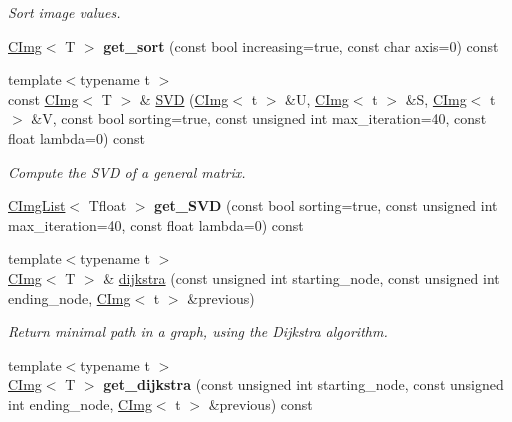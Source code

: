 \begin{DoxyCompactItemize}
\begin{DoxyCompactList}\small\item\em Sort image values. \item\end{DoxyCompactList}\item 
\hypertarget{structcimg__library_1_1CImg_a59e38885c680b39494d35dce5e6b2ff1}{
\hyperlink{structcimg__library_1_1CImg}{CImg}$<$ T $>$ {\bfseries get\_\-sort} (const bool increasing=true, const char axis=0) const }
\label{structcimg__library_1_1CImg_a59e38885c680b39494d35dce5e6b2ff1}

\item 
\hypertarget{structcimg__library_1_1CImg_a9a79f3a0849388b3ec13bd140b67a12e}{
{\footnotesize template$<$typename t $>$ }\\const \hyperlink{structcimg__library_1_1CImg}{CImg}$<$ T $>$ \& \hyperlink{structcimg__library_1_1CImg_a9a79f3a0849388b3ec13bd140b67a12e}{SVD} (\hyperlink{structcimg__library_1_1CImg}{CImg}$<$ t $>$ \&U, \hyperlink{structcimg__library_1_1CImg}{CImg}$<$ t $>$ \&S, \hyperlink{structcimg__library_1_1CImg}{CImg}$<$ t $>$ \&V, const bool sorting=true, const unsigned int max\_\-iteration=40, const float lambda=0) const }
\label{structcimg__library_1_1CImg_a9a79f3a0849388b3ec13bd140b67a12e}

\begin{DoxyCompactList}\small\item\em Compute the SVD of a general matrix. \item\end{DoxyCompactList}\item 
\hypertarget{structcimg__library_1_1CImg_aece4173d4d83dc68454beb4480535670}{
\hyperlink{structcimg__library_1_1CImgList}{CImgList}$<$ Tfloat $>$ {\bfseries get\_\-SVD} (const bool sorting=true, const unsigned int max\_\-iteration=40, const float lambda=0) const }
\label{structcimg__library_1_1CImg_aece4173d4d83dc68454beb4480535670}

\item 
{\footnotesize template$<$typename t $>$ }\\\hyperlink{structcimg__library_1_1CImg}{CImg}$<$ T $>$ \& \hyperlink{structcimg__library_1_1CImg_a255acd18f793e0faacd5180f0d10713b}{dijkstra} (const unsigned int starting\_\-node, const unsigned int ending\_\-node, \hyperlink{structcimg__library_1_1CImg}{CImg}$<$ t $>$ \&previous)
\begin{DoxyCompactList}\small\item\em Return minimal path in a graph, using the Dijkstra algorithm. \item\end{DoxyCompactList}\item 
\hypertarget{structcimg__library_1_1CImg_aeb501612014494cdc5c931a4476081d7}{
{\footnotesize template$<$typename t $>$ }\\\hyperlink{structcimg__library_1_1CImg}{CImg}$<$ T $>$ {\bfseries get\_\-dijkstra} (const unsigned int starting\_\-node, const unsigned int ending\_\-node, \hyperlink{structcimg__library_1_1CImg}{CImg}$<$ t $>$ \&previous) const }
\label{structcimg__library_1_1CImg_aeb501612014494cdc5c931a4476081d7}


\end{DoxyCompactItemize}
